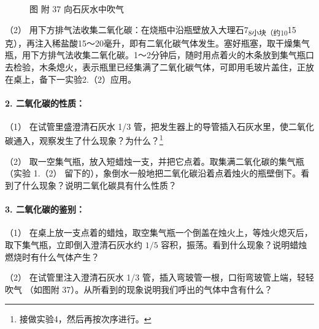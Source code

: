 \begin{figure}
\centering
\caption{图 附 37 向石灰水中吹气}
\end{figure}

（2）
用下方排气法收集二氧化碳：在烧瓶中沿瓶壁放入大理石7\textsubscript{8小块（约10}15克），再注入稀盐酸15～20毫升，即有二氧化碳气体发生。塞好瓶塞，取干燥集气瓶，用下方排气法收集二氧化碳。1～2分钟后，随时用点着火的木条放到集气瓶口去检验，木条熄火，表示瓶里已经集满了二氧化碳气体，可即用毛玻片盖住，正放在桌上，备下一实验2.（2）应用。

\paragraph{2. 二氧化碳的性质：}

（1） 在试管里盛澄清石灰水 1/3
管，把发生器上的导管插入石灰水里，使二氧化碳通入，观察发生了什么现象？为什么？\footnote{接做实验4，然后再按次序进行。}

（2） 取一空集气瓶，放入短蜡烛一支，并把它点着。取集满二氧化碳的集气瓶
（实验 1.（2）
留下的），象倒水一般地把二氧化碳沿着点着烛火的瓶壁倒下。看到了什么现象？说明二氧化碳具有什么性质？

\paragraph{3. 二氧化碳的鉴别：}

（1）
在桌上放一支点着的蜡烛，取空集气瓶一个倒盖在烛火上，等烛火熄灭后，取下集气瓶，立即倒入澄清石灰水约
\(1 / 5\) 容积，振荡。看到什么现象？说明蜡烛燃烧时有什么气体产生？

（2） 在试管里注入澄清石灰水 1/3
管，插入弯玻管一根，口衔弯玻管上端，轻轻吹气 （如图附
37）。从所看到的现象说明我们呼出的气体中含有什么？

